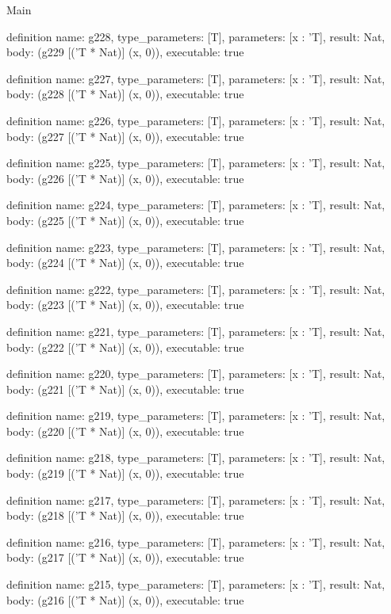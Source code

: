 \begin{lexlean}{Main}
\begin{semanticmodule}
definition{
  name: g228,
  type_parameters: [T],
  parameters: [x : 'T],
  result: Nat,
  body: (g229 [('T * Nat)] (x, 0)),
  executable: true
}

definition{
  name: g227,
  type_parameters: [T],
  parameters: [x : 'T],
  result: Nat,
  body: (g228 [('T * Nat)] (x, 0)),
  executable: true
}

definition{
  name: g226,
  type_parameters: [T],
  parameters: [x : 'T],
  result: Nat,
  body: (g227 [('T * Nat)] (x, 0)),
  executable: true
}

definition{
  name: g225,
  type_parameters: [T],
  parameters: [x : 'T],
  result: Nat,
  body: (g226 [('T * Nat)] (x, 0)),
  executable: true
}

definition{
  name: g224,
  type_parameters: [T],
  parameters: [x : 'T],
  result: Nat,
  body: (g225 [('T * Nat)] (x, 0)),
  executable: true
}

definition{
  name: g223,
  type_parameters: [T],
  parameters: [x : 'T],
  result: Nat,
  body: (g224 [('T * Nat)] (x, 0)),
  executable: true
}

definition{
  name: g222,
  type_parameters: [T],
  parameters: [x : 'T],
  result: Nat,
  body: (g223 [('T * Nat)] (x, 0)),
  executable: true
}

definition{
  name: g221,
  type_parameters: [T],
  parameters: [x : 'T],
  result: Nat,
  body: (g222 [('T * Nat)] (x, 0)),
  executable: true
}

definition{
  name: g220,
  type_parameters: [T],
  parameters: [x : 'T],
  result: Nat,
  body: (g221 [('T * Nat)] (x, 0)),
  executable: true
}

definition{
  name: g219,
  type_parameters: [T],
  parameters: [x : 'T],
  result: Nat,
  body: (g220 [('T * Nat)] (x, 0)),
  executable: true
}

definition{
  name: g218,
  type_parameters: [T],
  parameters: [x : 'T],
  result: Nat,
  body: (g219 [('T * Nat)] (x, 0)),
  executable: true
}

definition{
  name: g217,
  type_parameters: [T],
  parameters: [x : 'T],
  result: Nat,
  body: (g218 [('T * Nat)] (x, 0)),
  executable: true
}

definition{
  name: g216,
  type_parameters: [T],
  parameters: [x : 'T],
  result: Nat,
  body: (g217 [('T * Nat)] (x, 0)),
  executable: true
}

definition{
  name: g215,
  type_parameters: [T],
  parameters: [x : 'T],
  result: Nat,
  body: (g216 [('T * Nat)] (x, 0)),
  executable: true
}


\end{semanticmodule}
\end{lexlean}
